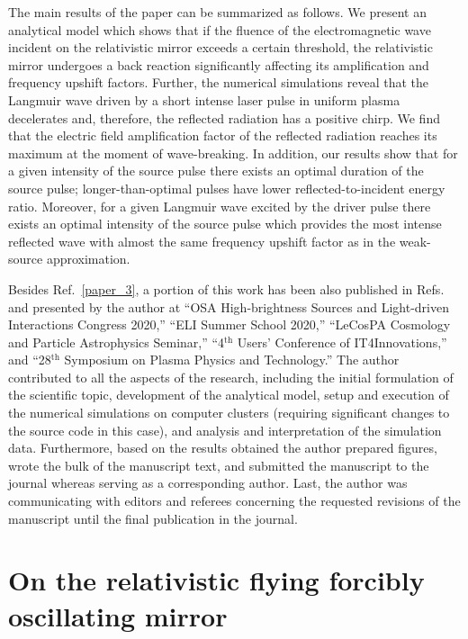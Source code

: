 \documentclass[10pt, a4paper, twoside, openright]{report}
\newcommand{\q}[1]{``#1''} %
\begin{document}
The main results of the paper can be summarized as follows. We present an analytical model which shows that if the fluence of the electromagnetic wave incident on the relativistic mirror exceeds a certain threshold, the relativistic mirror undergoes a back reaction significantly affecting its amplification and frequency upshift factors. Further, the numerical simulations reveal that the Langmuir wave driven by a short intense laser pulse in uniform plasma decelerates and, therefore, the reflected radiation has a positive chirp. We find that the electric field amplification factor of the reflected radiation reaches its maximum at the moment of wave-breaking. In addition, our results show that for a given intensity of the source pulse there exists an optimal duration of the source pulse; longer-than-optimal pulses have lower reflected-to-incident energy ratio. Moreover, for a given Langmuir wave excited by the driver pulse there exists an optimal intensity of the source pulse which provides the most intense reflected wave with almost the same frequency upshift factor as in the weak-source approximation.

Besides Ref.~\ref{paper_3}, a portion of this work has been also published in Refs.~ and presented by the author at \q{OSA High-brightness Sources and Light-driven Interactions Congress 2020,} \q{ELI Summer School 2020,} \q{LeCosPA Cosmology and Particle Astrophysics Seminar,} \q{4$ ^{\mathrm{th}} $ Users' Conference of IT4Innovations,} and \q{28$ ^{\mathrm{th}} $ Symposium on Plasma Physics and Technology.} The author contributed to all the aspects of the research, including the initial formulation of the scientific topic, development of the analytical model, setup and execution of the numerical simulations on computer clusters (requiring significant changes to the source code in this case), and analysis and interpretation of the simulation data. Furthermore, based on the results obtained the author prepared figures, wrote the bulk of the manuscript text, and submitted the manuscript to the journal whereas serving as a corresponding author. Last, the author was communicating with editors and referees concerning the requested revisions of the manuscript until the final publication in the journal.


\section{On the relativistic flying forcibly oscillating mirror\label{sec:on_the_relativistic_flying_forcibly_oscillating_mirror}}
%
\end{document}
